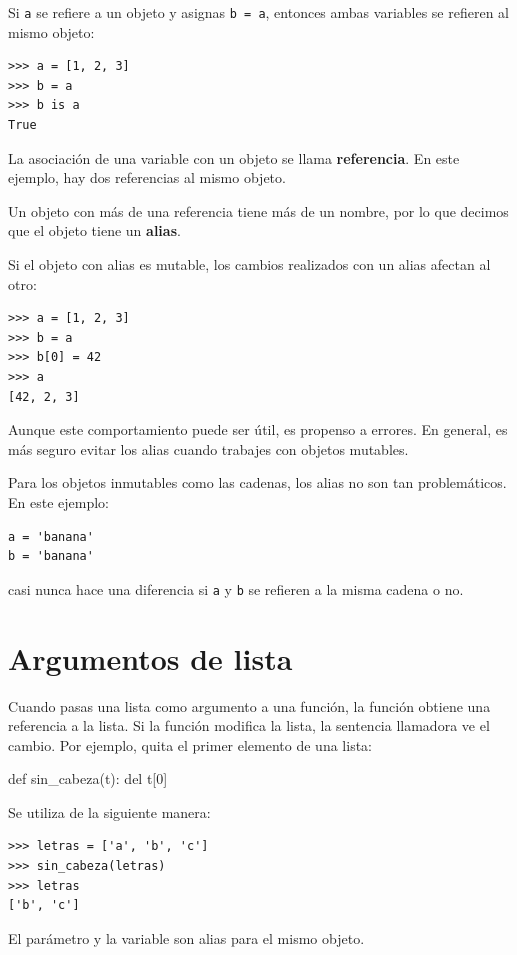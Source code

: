 Si \texttt{a} se refiere a un objeto y asignas \texttt{b = a},
entonces ambas variables se refieren al mismo objeto:

\begin{Verbatim}[frame=single]
>>> a = [1, 2, 3]
>>> b = a
>>> b is a
True
\end{Verbatim}
%

La asociación de una variable con un objeto se llama \textbf{
referencia}.  En este ejemplo, hay dos referencias al mismo
objeto.

Un objeto con más de una referencia tiene más
de un nombre, por lo que decimos que el objeto tiene un \textbf{ alias}.

Si el objeto con alias es mutable, los cambios realizados con un alias afectan
al otro:

\begin{Verbatim}[frame=single]
>>> a = [1, 2, 3]
>>> b = a
>>> b[0] = 42
>>> a
[42, 2, 3]
\end{Verbatim}
%
Aunque este comportamiento puede ser útil, es propenso a errores.  En general,
es más seguro evitar los alias cuando trabajes con objetos
mutables.

Para los objetos inmutables como las cadenas, los alias no son tan
problemáticos.  En este ejemplo:

\begin{Verbatim}[frame=single]
a = 'banana'
b = 'banana'
\end{Verbatim}
%
casi nunca hace una diferencia si \texttt{a} y \texttt{b} se refieren
a la misma cadena o no.


\section{Argumentos de lista}
\label{list.arguments}

Cuando pasas una lista como argumento a una función, la función obtiene una referencia a
la lista.  Si la función modifica la lista, la sentencia llamadora ve
el cambio.  Por ejemplo,  quita el primer elemento
de una lista:

\begin{python}[frame=single]
def sin_cabeza(t):
    del t[0]
\end{python}
%
Se utiliza de la siguiente manera:

\begin{Verbatim}[frame=single]
>>> letras = ['a', 'b', 'c']
>>> sin_cabeza(letras)
>>> letras
['b', 'c']
\end{Verbatim}
%
El parámetro  y la variable  son
alias para el mismo objeto.  

